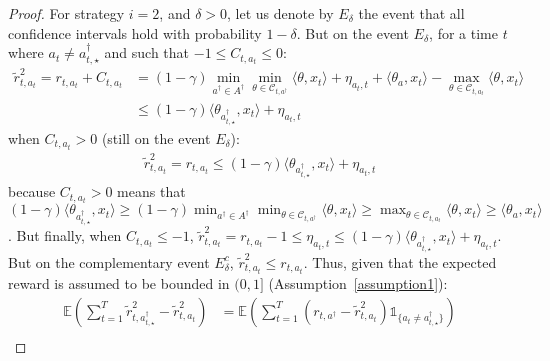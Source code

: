 \begin{proof}

For strategy $i=2$, and $\delta>0$, let us denote by $E_{\delta}$ the event that all confidence intervals hold with probability $1 - \delta$. But on the event $E_{\delta}$, for a time $t$ where $a_{t}\neq a^{\dagger}_{t,\star}$ and such that $-1\leq C_{t,a_{t}} \leq 0$:
\begin{align*}
\tilde{r}^{2}_{t,a_{t}} = r_{t, a_{t}} + C_{t,a_{t}} &= (1 - \gamma)\min_{a^{\dagger}\in A^{\dagger}} \min_{\theta\in \mathcal{C}_{t,a^{\dagger}}} \langle \theta, x_{t}\rangle + \eta_{a_{t},t} + \langle\theta_{a}, x_{t}\rangle - \max_{\theta\in \mathcal{C}_{t,a_{t}}} \langle \theta, x_{t}\rangle \\
&\leq (1 - \gamma) \langle \theta_{a^{\dagger}_{t,\star}}, x_{t}\rangle + \eta_{a_{t},t}
\end{align*}
when $C_{t,a_{t}} >0$ (still on the event $E_{\delta}$):
\begin{align*}
\tilde{r}^{2}_{t,a_{t}} = r_{t,a_{t}} \leq (1 - \gamma) \langle \theta_{a^{\dagger}_{t,\star}}, x_{t}\rangle + \eta_{a_{t},t}
\end{align*}
because $C_{t,a_{t}}>0$ means that $(1 - \gamma) \langle \theta_{a^{\dagger}_{t,\star}}, x_{t}\rangle \geq (1 - \gamma)\min_{a^{\dagger}\in A^{\dagger}}\min_{\theta\in \mathcal{C}_{t,a^{\dagger}}} \langle \theta, x_{t}\rangle \geq \max_{\theta\in \mathcal{C}_{t,a_{t}}} \langle \theta, x_{t}\rangle \geq \langle \theta_{a}, x_{t}\rangle$. But finally, when $C_{t,a_{t}} \leq -1$, $\tilde{r}^{2}_{t,a_{t}} = r_{t,a_{t}} -1 \leq \eta_{a_{t},t} \leq (1- \gamma)\langle \theta_{a^{\dagger}_{t,\star}}, x_{t}\rangle + \eta_{a_{t},t}$.  But on the complementary event $E_{\delta}^{c}$,  $ \tilde{r}^{2}_{t,a_{t}} \leq r_{t,a_t}$. Thus, given that the expected reward is assumed to be bounded in $(0,1]$ (Assumption~\ref{assumption1}):
\begin{align*}
    \mathbb{E}\left(\sum_{t=1}^{T} \tilde{r}^{2}_{t, a^{\dagger}_{t,\star}} - \tilde{r}^{2}_{t,a_{t}} \right) & =  \mathbb{E}\left(\sum_{t=1}^{T} (r_{t, a^{\dagger}} - \tilde{r}^{2}_{t,a_{t}})\mathds{1}_{\{a_{t}\neq a^{\dagger}_{t,\star}\}} \right) \\

\end{align*}
\end{proof}
